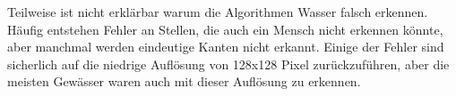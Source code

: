 Teilweise ist nicht erklärbar warum die Algorithmen Wasser falsch erkennen.
Häufig entstehen Fehler an Stellen, die auch ein Mensch nicht erkennen könnte, aber manchmal werden eindeutige Kanten nicht erkannt.
Einige der Fehler sind sicherlich auf die niedrige Auflösung von 128x128 Pixel zurückzuführen, aber die meisten Gewässer waren auch mit dieser Auflösung zu erkennen.

